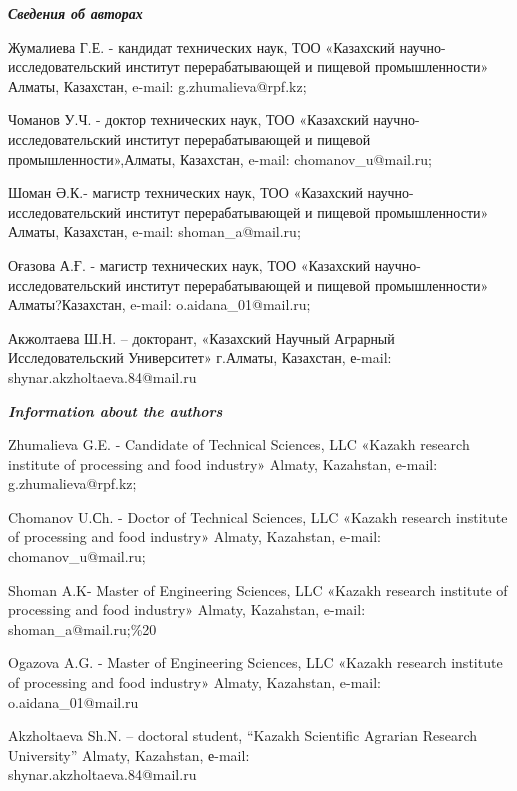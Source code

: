 \begin{authorinfo}
\emph{{\bfseries Сведения об авторах}}

Жумалиева Г.Е. - кандидат технических наук, ТОО «Казахский
научно-исследовательский институт перерабатывающей и пищевой
промышленности» Алматы, Казахстан, e-mail: g.zhumalieva@rpf.kz;

Чоманов У.Ч. - доктор технических наук, ТОО «Казахский
научно-исследовательский институт перерабатывающей и пищевой
промышленности»,Алматы, Казахстан, e-mail: chomanov\_u@mail.ru;

Шоман Ә.К.- магистр технических наук, ТОО «Казахский
научно-исследовательский институт перерабатывающей и пищевой
промышленности» Алматы, Казахстан, e-mail: shoman\_a@mail.ru;

Оғазова А.Ғ. - магистр технических наук, ТОО «Казахский
научно-исследовательский институт перерабатывающей и пищевой
промышленности» Алматы?Казахстан, e-mail: o.aidana\_01@mail.ru;

Акжолтаева Ш.Н. – докторант, «Казахский Научный Аграрный
Исследовательский Университет» г.Алматы, Казахстан, е-mail:
shynar.akzholtaeva.84@mail.ru

\emph{{\bfseries Information about the authors}}

Zhumalieva G.E. - Candidate of Technical Sciences, LLC «Kazakh research
institute of processing and food industry» Almaty, Kazahstan, e-mail:
g.zhumalieva@rpf.kz;

Chomanov U.Сh. - Doctor of Technical Sciences, LLC «Kazakh research
institute of processing and food industry» Almaty, Kazahstan, e-mail:
chomanov\_u@mail.ru;

Shoman A.K- Master of Engineering Sciences, LLC «Kazakh research
institute of processing and food industry» Almaty, Kazahstan, e-mail:
shoman\_a@mail.ru;\%20

Ogazova A.G. - Master of Engineering Sciences, LLC «Kazakh research
institute of processing and food industry» Almaty, Kazahstan, e-mail:
o.aidana\_01@mail.ru

Akzholtaeva Sh.N. – doctoral student, “Kazakh Scientific Agrarian
Research University” Almaty, Kazahstan, е-mail:\\
shynar.akzholtaeva.84@mail.ru
\end{authorinfo}
